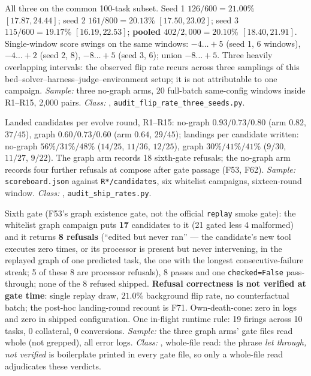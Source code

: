 \begin{description}[leftmargin=0pt,labelindent=0pt,labelsep=0pt,style=nextline,font=\normalfont,itemsep=6pt]
\item[\textbf{F9e}\quad Wilson intervals on the same-config flip rate,
      three seeds.]
All three on the common 100-task subset. Seed 1 $126/600 = 21.00\%$
$[17.87, 24.44]$; seed 2 $161/800 = 20.13\%$ $[17.50, 23.02]$; seed 3
$115/600 = 19.17\%$ $[16.19, 22.53]$; \textbf{pooled $402/2{,}000 =
20.10\%$ $[18.40, 21.91]$}. Single-window score swings on the same
windows: $-4\ldots{+}5$ (seed 1, 6 windows), $-4\ldots{+}2$ (seed 2, 8),
$-8\ldots{+}5$ (seed 3, 6); union $-8\ldots{+}5$. Three heavily overlapping intervals: the observed flip rate recurs across three samplings of this
bed--solver--harness--judge--environment setup; it is not attributable to
one campaign. \emph{Sample:} three
no-graph arms, 20 full-batch same-config windows inside R1--R15, 2{,}000
pairs. \emph{Class:} ,
\texttt{audit\_flip\_rate\_three\_seeds.py}.

\item[\textbf{F10}\quad Ship rate.]
Landed candidates per evolve round, R1--R15: no-graph $0.93/0.73/0.80$
(arm $0.82$, $37/45$), graph $0.60/0.73/0.60$ (arm $0.64$, $29/45$);
landings per candidate written: no-graph $56\%/31\%/48\%$ ($14/25$, $11/36$,
$12/25$), graph $30\%/41\%/41\%$ ($9/30$, $11/27$, $9/22$). The graph
arm records 18 sixth-gate refusals; the no-graph arm records four further
refusals at compose after gate passage (F53, F62). \emph{Sample:} \texttt{scoreboard.json}
against \texttt{R*/candidates}, six whitelist campaigns, sixteen-round
window. \emph{Class:} , \texttt{audit\_ship\_rates.py}.

\item[\textbf{F11}\quad Live record of the graph-only mechanisms.]
Sixth gate (F53's graph existence gate, not the official \texttt{replay}
smoke gate): the whitelist graph campaign puts \textbf{17} candidates to
it (21 gated less 4 malformed) and it returns \textbf{8 refusals}
(``edited but never ran'' --- the candidate's new tool executes zero times,
or its processor is present but never intervening, in the replayed graph
of one predicted task, the one with the longest consecutive-failure
streak; 5 of these 8 are processor refusals), 8 passes and one
\texttt{checked=False} pass-through; none of the 8 refused shipped. \textbf{Refusal correctness
is not verified at gate time}: single replay draw, $21.0\%$ background flip rate, no
counterfactual batch; the post-hoc landing-round recount is F71. Own-death-cone: zero in logs and zero in shipped
configuration. One in-flight runtime rule: 19 firings across 10 tasks, 0
collateral, 0 conversions. \emph{Sample:} the three graph arms' gate files
read whole (not grepped), all error logs. \emph{Class:} ,
whole-file read: the phrase \emph{let through, not verified} is
boilerplate printed in every gate file, so only a whole-file read
adjudicates these verdicts.


\end{description}
